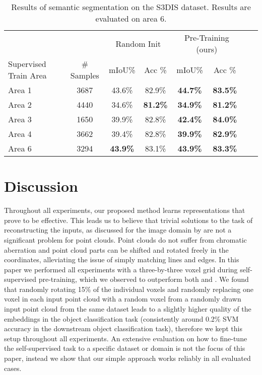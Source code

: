 \documentclass{article}
\begin{document}
\begin{table}
\vskip -0.2in
\caption{Results of semantic segmentation on the S3DIS dataset. Results are evaluated on area 6.}
\label{s3distable}
\begin{center}
\begin{small}
\begin{tabular}{lccccccr}
\toprule
& & \multicolumn{2}{c}{Random Init} & \multicolumn{2}{c}{Pre-Training (ours)}\\
Supervised Train Area & \# Samples & mIoU\% & Acc \% & mIoU\% & Acc \%\\
\midrule
Area 1 & 3687 & 43.6\% & 82.9\%& \textbf{44.7\%} & \textbf{83.5\%}\\
Area 2 & 4440 & 34.6\% & \textbf{81.2\%}& \textbf{34.9\%} & \textbf{81.2\%}\\
Area 3 & 1650 & 39.9\% & 82.8\%& \textbf{42.4\%} & \textbf{84.0\%}\\
Area 4 & 3662 & 39.4\% & 82.8\%& \textbf{39.9\%} & \textbf{82.9\%}\\
Area 6 & 3294 & \textbf{43.9\%} & 83.1\%& \textbf{43.9\%} & \textbf{83.3\%}\\
\bottomrule
\end{tabular}
\end{small}
\end{center}
\vskip -0.2in
\end{table}

\section{Discussion}
\label{discussion}

Throughout all experiments, our proposed method learns representations that prove to be effective. This leads us to believe that trivial solutions to the task of reconstructing the inputs, as discussed for the image domain by \cite{contextprediction, jigsaw} are not a significant problem for point clouds. Point clouds do not suffer from chromatic aberration and point cloud parts can be shifted and rotated freely in the coordinates, alleviating the issue of simply matching lines and edges. In this paper we performed all experiments with a three-by-three voxel grid during self-supervised pre-training, which we observed to outperform both  and . We found that randomly rotating 15\% of the individual voxels and randomly replacing one voxel in each input point cloud with a random voxel from a randomly drawn input point cloud from the same dataset leads to a slightly higher quality of the embeddings in the object classification task (consistently around 0.2\% SVM accuracy in the downstream object classification task), therefore we kept this setup throughout all experiments. An extensive evaluation on how to fine-tune the self-supervised task to a specific dataset or domain is not the focus of this paper, instead we show that our simple approach works reliably in all evaluated cases.
\end{document}
